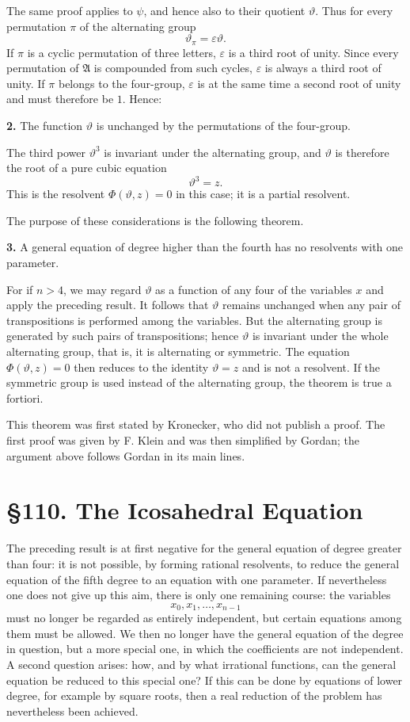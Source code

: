 \documentclass[12pt,a4paper]{article}
\newcommand{\webersection}[2]{\clearpage\section*{\S #1. #2}\addcontentsline{toc}{section}{\S #1. #2}}
\newcommand{\A}{\mathfrak A}
\begin{document}
The same proof applies to $\psi$, and hence also to their quotient $\vartheta$.  Thus for every permutation $\pi$ of the alternating group
\begin{equation}
 \vartheta_\pi=\varepsilon\vartheta.
\end{equation}
If $\pi$ is a cyclic permutation of three letters, $\varepsilon$ is a third root of unity.  Since every permutation of $\A$ is compounded from such cycles, $\varepsilon$ is always a third root of unity.  If $\pi$ belongs to the four-group, $\varepsilon$ is at the same time a second root of unity and must therefore be $1$.  Hence:

\textbf{2.} The function $\vartheta$ is unchanged by the permutations of the four-group.

The third power $\vartheta^3$ is invariant under the alternating group, and $\vartheta$ is therefore the root of a pure cubic equation
\[
 \vartheta^3=z.
\]
This is the resolvent $\Phi(\vartheta,z)=0$ in this case; it is a partial resolvent.

The purpose of these considerations is the following theorem.

\textbf{3.} A general equation of degree higher than the fourth has no resolvents with one parameter.

For if $n>4$, we may regard $\vartheta$ as a function of any four of the variables $x$ and apply the preceding result.  It follows that $\vartheta$ remains unchanged when any pair of transpositions is performed among the variables.  But the alternating group is generated by such pairs of transpositions; hence $\vartheta$ is invariant under the whole alternating group, that is, it is alternating or symmetric.  The equation $\Phi(\vartheta,z)=0$ then reduces to the identity $\vartheta=z$ and is not a resolvent.  If the symmetric group is used instead of the alternating group, the theorem is true a fortiori.

This theorem was first stated by Kronecker, who did not publish a proof.  The first proof was given by F. Klein and was then simplified by Gordan; the argument above follows Gordan in its main lines.

\webersection{110}{The Icosahedral Equation}

The preceding result is at first negative for the general equation of degree greater than four: it is not possible, by forming rational resolvents, to reduce the general equation of the fifth degree to an equation with one parameter.  If nevertheless one does not give up this aim, there is only one remaining course: the variables
\[
 x_0,x_1,
\ldots,x_{n-1}
\]
must no longer be regarded as entirely independent, but certain equations among them must be allowed.  We then no longer have the general equation of the degree in question, but a more special one, in which the coefficients are not independent.  A second question arises: how, and by what irrational functions, can the general equation be reduced to this special one?  If this can be done by equations of lower degree, for example by square roots, then a real reduction of the problem has nevertheless been achieved.
\end{document}

